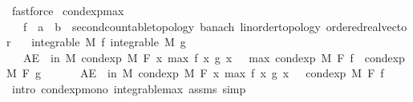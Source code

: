 \begin{isabellebody}
\ fastforce\isanewline
{}\isamarkupfalse%
%
\endisatagproof
{\isafoldproof}%
%
\isadelimproof
\isanewline
%
\endisadelimproof
\isanewline
{}\isamarkupfalse%
\ cond{\isacharunderscore}{\kern0pt}exp{\isacharunderscore}{\kern0pt}max{\isacharcolon}{\kern0pt}\isanewline
\ \ \ f\ {\isacharcolon}{\kern0pt}{\isacharcolon}{\kern0pt}\ {\isachardoublequoteopen}{\isacharprime}{\kern0pt}a\ {\isasymRightarrow}\ {\isacharprime}{\kern0pt}b\ {\isacharcolon}{\kern0pt}{\isacharcolon}{\kern0pt}\ {\isacharbraceleft}{\kern0pt}second{\isacharunderscore}{\kern0pt}countable{\isacharunderscore}{\kern0pt}topology{\isacharcomma}{\kern0pt}\ banach{\isacharcomma}{\kern0pt}\ linorder{\isacharunderscore}{\kern0pt}topology{\isacharcomma}{\kern0pt}\ ordered{\isacharunderscore}{\kern0pt}real{\isacharunderscore}{\kern0pt}vector{\isacharbraceright}{\kern0pt}{\isachardoublequoteclose}\isanewline
\ \ \ {\isachardoublequoteopen}integrable\ M\ f{\isachardoublequoteclose}\ {\isachardoublequoteopen}integrable\ M\ g{\isachardoublequoteclose}\isanewline
\ \ \ {\isachardoublequoteopen}AE\ {\isasymxi}\ in\ M{\isachardot}{\kern0pt}\ cond{\isacharunderscore}{\kern0pt}exp\ M\ F\ {\isacharparenleft}{\kern0pt}{\isasymlambda}x{\isachardot}{\kern0pt}\ max\ {\isacharparenleft}{\kern0pt}f\ x{\isacharparenright}{\kern0pt}\ {\isacharparenleft}{\kern0pt}g\ x{\isacharparenright}{\kern0pt}{\isacharparenright}{\kern0pt}\ {\isasymxi}\ {\isasymge}\ max\ {\isacharparenleft}{\kern0pt}cond{\isacharunderscore}{\kern0pt}exp\ M\ F\ f\ {\isasymxi}{\isacharparenright}{\kern0pt}\ {\isacharparenleft}{\kern0pt}cond{\isacharunderscore}{\kern0pt}exp\ M\ F\ g\ {\isasymxi}{\isacharparenright}{\kern0pt}{\isachardoublequoteclose}\isanewline
%
\isadelimproof
%
\endisadelimproof
%
\isatagproof
{}\isamarkupfalse%
\ {\isacharminus}{\kern0pt}\isanewline
\ \ \isamarkupfalse%
\ {\isachardoublequoteopen}AE\ {\isasymxi}\ in\ M{\isachardot}{\kern0pt}\ cond{\isacharunderscore}{\kern0pt}exp\ M\ F\ {\isacharparenleft}{\kern0pt}{\isasymlambda}x{\isachardot}{\kern0pt}\ max\ {\isacharparenleft}{\kern0pt}f\ x{\isacharparenright}{\kern0pt}\ {\isacharparenleft}{\kern0pt}g\ x{\isacharparenright}{\kern0pt}{\isacharparenright}{\kern0pt}\ {\isasymxi}\ {\isasymge}\ cond{\isacharunderscore}{\kern0pt}exp\ M\ F\ f\ {\isasymxi}{\isachardoublequoteclose}\ \isamarkupfalse%
\ {\isacharparenleft}{\kern0pt}intro\ cond{\isacharunderscore}{\kern0pt}exp{\isacharunderscore}{\kern0pt}mono\ integrable{\isacharunderscore}{\kern0pt}max\ assms{\isacharcomma}{\kern0pt}\ simp{\isacharparenright}{\kern0pt}\isanewline

\end{isabellebody}
